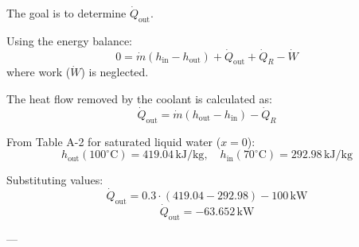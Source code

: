 The goal is to determine \( \dot{Q}_{\text{out}} \).  

Using the energy balance:  
\[
0 = \dot{m} (h_{\text{in}} - h_{\text{out}}) + \dot{Q}_{\text{out}} + \dot{Q}_R - \dot{W}
\]  
where work (\( \dot{W} \)) is neglected.  

The heat flow removed by the coolant is calculated as:  
\[
\dot{Q}_{\text{out}} = \dot{m} (h_{\text{out}} - h_{\text{in}}) - \dot{Q}_R
\]  

From Table A-2 for saturated liquid water (\( x = 0 \)):  
\[
h_{\text{out}}(100^\circ\text{C}) = 419.04 \, \text{kJ/kg}, \quad h_{\text{in}}(70^\circ\text{C}) = 292.98 \, \text{kJ/kg}
\]  

Substituting values:  
\[
\dot{Q}_{\text{out}} = 0.3 \cdot (419.04 - 292.98) - 100 \, \text{kW}
\]  
\[
\dot{Q}_{\text{out}} = -63.652 \, \text{kW}
\]  

---